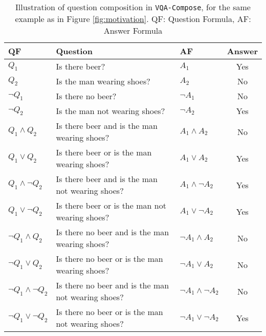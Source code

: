 \begin{table}[!t]
    \centering
    \begin{tabular}{@{}lp{8.6cm}lc@{}}
    \toprule 
    \textbf{QF} & \textbf{Question} & \textbf{AF} & \textbf{Answer}\\
    \midrule
    $Q_1$                       & Is there beer?                                    & $A_1$     & Yes \\
    $Q_2$                       & Is the man wearing shoes?                         & $A_2$     & No \\
    ${\neg}Q_1$                  & Is there no beer?                                 & ${\neg}A_1$ & No\\
    ${\neg}Q_2$                  & Is the man not wearing shoes?                     & ${\neg}A_2$ & Yes\\
    $Q_1{\wedge}Q_2$            & Is there beer and is the man wearing shoes?       & $A_1{\wedge}A_2$ & No \\
    $Q_1{\vee}Q_2$              & Is there beer or is the man wearing shoes?        & $A_1{\vee}A_2$ & Yes \\
    $Q_1{\wedge}{\neg}Q_2$       & Is there beer and is the man not wearing shoes?   & $A_1{\wedge}{\neg}A_2$ & Yes \\
    $Q_1{\vee}{\neg}Q_2$         & Is there beer or is the man not wearing shoes?    & $A_1{\vee}{\neg}A_2$ & Yes \\
    ${\neg}Q_1{\wedge}Q_2$       & Is there no beer and is the man wearing shoes?    & ${\neg}A_1{\wedge}A_2$ & No \\
    ${\neg}Q_1{\vee}Q_2$         & Is there no beer or is the man wearing shoes?     & ${\neg}A_1{\vee}A_2$ & No \\
    ${\neg}Q_1{\wedge}{\neg}Q_2$  & Is there no beer and is the man not wearing shoes?& ${\neg}A_1{\wedge}{\neg}A_2 $ & No \\
    ${\neg}Q_1{\vee}{\neg}Q_2$    & Is there no beer or is the man not wearing shoes? & ${\neg}A_1{\vee}{\neg}A_2$ & Yes \\
    \bottomrule
    \end{tabular}
    \caption{Illustration of question composition in \texttt{VQA-Compose}, for the same example as in Figure \ref{fig:motivation}.
    QF: Question Formula, AF: Answer Formula}
    \label{tab:compose}
\end{table}

